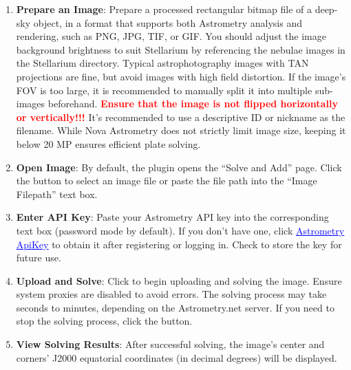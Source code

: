 \begin{enumerate}
    \item \textbf{Prepare an Image}: Prepare a processed rectangular bitmap file of a deep-sky object, 
	in a format that supports both Astrometry analysis and rendering, such as PNG, JPG, TIF, or GIF. 
	You should adjust the image background brightness to suit Stellarium 
	by referencing the nebulae images in the Stellarium  directory. Typical 
	astrophotography images with TAN projections are fine, but avoid images with high field distortion. 
	If the image's FOV is too large, it is recommended to manually split it into multiple sub-images beforehand. 
	\textbf{\textcolor{red}{Ensure that the image is not flipped horizontally or vertically!!!}} 
	It’s recommended to use a descriptive ID or nickname as the filename. 
	While Nova Astrometry does not strictly limit image size, keeping it below 20 MP 
	ensures efficient plate solving.

    \item \textbf{Open Image}: By default, the plugin opens the “Solve and Add” page. Click the  
	button to select an image file or paste the file path into the “Image Filepath” text box.

    \item \textbf{Enter API Key}: Paste your Astrometry API key into the corresponding text box (password 
	mode by default). If you don’t have one, click \href{https://nova.astrometry.net/api_help}{\textcolor{blue}{\underline{Astrometry ApiKey}}} to obtain it 
	after registering or logging in. Check  to store the key for future use.

    \item \textbf{Upload and Solve}: Click  to begin uploading and solving the image. Ensure system 
	proxies are disabled to avoid errors. The solving process may take seconds to minutes, 
	depending on the Astrometry.net server. If you need to stop the solving process, click the  button.

    \item \textbf{View Solving Results}: After successful solving, the image's center and corners' J2000 
	equatorial coordinates (in decimal degrees) will be displayed.


\end{enumerate}

